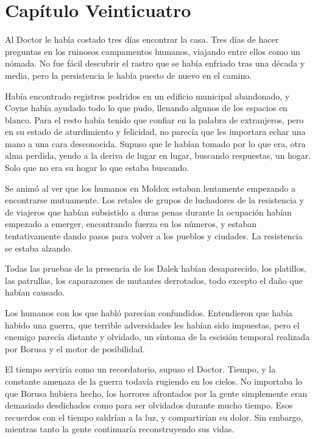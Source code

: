 \chapter*{Capítulo Veinticuatro}

Al Doctor le había costado tres días encontrar la casa. Tres días de hacer preguntas en los ruinosos campamentos humanos, viajando entre ellos como un nómada. No fue fácil descubrir el rastro que se había enfriado tras una década y media, pero la persistencia le había puesto de nuevo en el camino.

Había encontrado registros podridos en un edificio municipal abandonado, y Coyne había ayudado todo lo que pudo, llenando algunos de los espacios en blanco. Para el resto había tenido que confiar en la palabra de extranjeros, pero en su estado de aturdimiento y felicidad, no parecía que les importara echar una mano a una cara desconocida. Supuso que le habían tomado por lo que era, otra alma perdida, yendo a la deriva de lugar en lugar, buscando respuestas, un hogar. Solo que no era su hogar lo que estaba buscando.

Se animó al ver que los humanos en Moldox estaban lentamente empezando a encontrarse mutuamente. Los retales de grupos de luchadores de la resistencia y de viajeros que habían subsistido a duras penas durante la ocupación habían empezado a emerger, encontrando fuerza en los números, y estaban tentativamente dando pasos para volver a los pueblos y ciudades. La resistencia se estaba alzando.

Todas las pruebas de la presencia de los Dalek habían desaparecido, los platillos, las patrullas, los caparazones de mutantes derrotados, todo excepto el daño que habían causado.

Los humanos con los que habló parecían confundidos. Entendieron que había habido una guerra, que terrible adversidades les habían sido impuestas, pero el enemigo parecía distante y olvidado, un síntoma de la escisión temporal realizada por Borusa y el motor de posibilidad.

El tiempo serviría como un recordatorio, supuso el Doctor. Tiempo, y la constante amenaza de la guerra todavía rugiendo en los cielos. No importaba lo que Borusa hubiera hecho, los horrores afrontados por la gente simplemente eran demasiado desdichados como para ser olvidados durante mucho tiempo. Esos recuerdos con el tiempo saldrían a la luz, y compartirían su dolor. Sin embargo, mientras tanto la gente continuaría reconstruyendo sus vidas.

